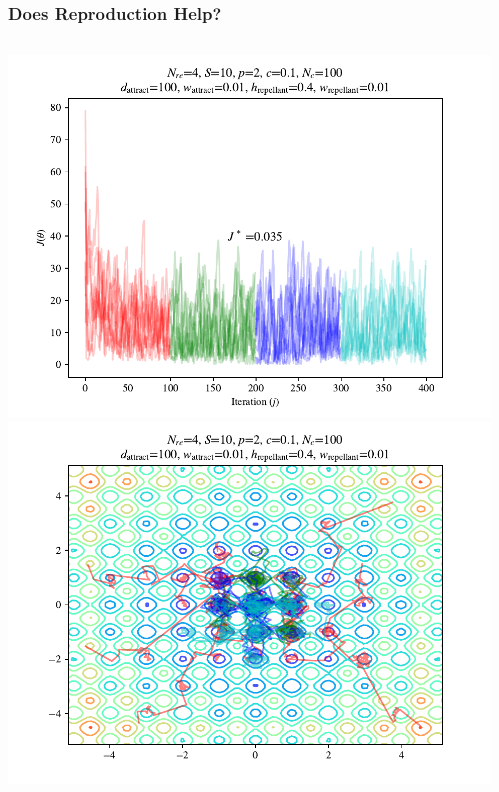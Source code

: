 \documentclass{beamer}
\begin{document}
\begin{frame}
\frametitle{Does Reproduction Help?}
\begin{columns}
    \begin{center}
      \includegraphics[scale=0.3]{assets/rastrigin_colony_re_J}
      \includegraphics[scale=0.3]{assets/rastrigin_colony_re_theta}
    \end{center}
  \begin{center}

\end{center}
\end{columns}
\end{frame}
\end{document}
